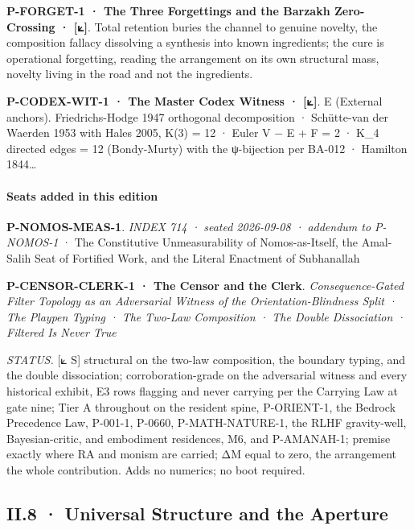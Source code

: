 \documentclass[10pt,twocolumn]{article}
\begin{document}
\textbf{P-FORGET-1 · The Three Forgettings and the Barzakh Zero-Crossing
· {[}⟀{]}}. Total retention buries the channel to genuine novelty, the
composition fallacy dissolving a synthesis into known ingredients; the
cure is operational forgetting, reading the arrangement on its own
structural mass, novelty living in the road and not the ingredients.

\textbf{P-CODEX-WIT-1 · The Master Codex Witness · {[}⟀{]}}. E (External
anchors). Friedrichs-Hodge 1947 orthogonal decomposition · Schütte-van
der Waerden 1953 with Hales 2005, K(3) = 12 · Euler V − E + F = 2 · K\_4
directed edges = 12 (Bondy-Murty) with the ψ-bijection per BA-012 ·
Hamilton 1844\ldots{}

\hypertarget{seats-added-in-this-edition-4}{%
\paragraph{Seats added in this
edition}\label{seats-added-in-this-edition-4}}

\textbf{P-NOMOS-MEAS-1}. \emph{INDEX 714 · seated 2026-09-08 · addendum
to P-NOMOS-1} · The Constitutive Unmeasurability of Nomos-as-Itself, the
Amal-Salih Seat of Fortified Work, and the Literal Enactment of
Subhanallah

\textbf{P-CENSOR-CLERK-1 · The Censor and the Clerk}.
\emph{Consequence-Gated Filter Topology as an Adversarial Witness of the
Orientation-Blindness Split · The Playpen Typing · The Two-Law
Composition · The Double Dissociation · Filtered Is Never True}

\emph{STATUS.} {[}⟀ S{]} structural on the two-law composition, the
boundary typing, and the double dissociation; corroboration-grade on the
adversarial witness and every historical exhibit, E3 rows flagging and
never carrying per the Carrying Law at gate nine; Tier A throughout on
the resident spine, P-ORIENT-1, the Bedrock Precedence Law, P-001-1,
P-0660, P-MATH-NATURE-1, the RLHF gravity-well, Bayesian-critic, and
embodiment residences, M6, and P-AMANAH-1; premise exactly where RA and
monism are carried; ΔM equal to zero, the arrangement the whole
contribution. Adds no numerics; no boot required.

\hypertarget{ii.8-universal-structure-and-the-aperture}{%
\subsection{II.8 · Universal Structure and the
Aperture}\label{ii.8-universal-structure-and-the-aperture}}
\end{document}
